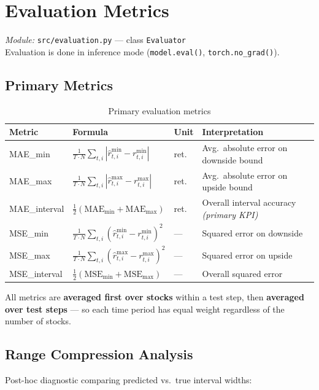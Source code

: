\documentclass[12pt,a4paper]{article}
\newcommand{\codeinline}[1]{\texttt{\small #1}}
\begin{document}
\section{Evaluation Metrics}

\textit{Module:} \codeinline{src/evaluation.py} — class \codeinline{Evaluator}\\
Evaluation is done in inference mode (\codeinline{model.eval()}, \codeinline{torch.no\_grad()}).

\subsection{Primary Metrics}

\begin{table}[H]
\centering
\begin{tabular}{L{3cm} L{5.5cm} C{1.5cm} L{3.5cm}}
\toprule
\textbf{Metric} & \textbf{Formula} & \textbf{Unit} & \textbf{Interpretation} \\
\midrule
MAE\_min &
  $\frac{1}{T \cdot N}\sum_{t,i}|\hat{r}^{\min}_{t,i} - r^{\min}_{t,i}|$ &
  ret. & Avg.\ absolute error on downside bound \\[0.4em]
MAE\_max &
  $\frac{1}{T \cdot N}\sum_{t,i}|\hat{r}^{\max}_{t,i} - r^{\max}_{t,i}|$ &
  ret. & Avg.\ absolute error on upside bound \\[0.4em]
MAE\_interval &
  $\frac{1}{2}(\text{MAE}_{\min} + \text{MAE}_{\max})$ &
  ret. & Overall interval accuracy \textit{(primary KPI)} \\[0.4em]
MSE\_min &
  $\frac{1}{T \cdot N}\sum_{t,i}(\hat{r}^{\min}_{t,i} - r^{\min}_{t,i})^2$ &
  — & Squared error on downside \\[0.4em]
MSE\_max &
  $\frac{1}{T \cdot N}\sum_{t,i}(\hat{r}^{\max}_{t,i} - r^{\max}_{t,i})^2$ &
  — & Squared error on upside \\[0.4em]
MSE\_interval &
  $\frac{1}{2}(\text{MSE}_{\min} + \text{MSE}_{\max})$ &
  — & Overall squared error \\
\bottomrule
\end{tabular}
\caption{Primary evaluation metrics}
\end{table}

All metrics are \textbf{averaged first over stocks} within a test step, then \textbf{averaged over test steps} — so each time period has equal weight regardless of the number of stocks.

\subsection{Range Compression Analysis}
Post-hoc diagnostic comparing predicted vs.\ true interval widths:
\end{document}
